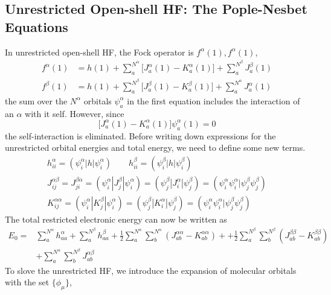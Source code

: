 \documentclass[11pt]{article}
\begin{document}
\subsection{Unrestricted Open-shell HF\@: The Pople-Nesbet Equations}
In unrestricted open-shell HF, the Fock operator is $f^\alpha(1), f^\alpha(1)$,
\begin{equation}
    \begin{split}
        f^\alpha(1)&=h(1)+\sum_{a}^{N^\alpha}\Big[J^\alpha_a(1)-K^\alpha_a(1)\Big]+\sum_{a}^{N^\beta}J^\beta_a(1)\\
        f^\beta(1)&=h(1)+\sum_{a}^{N^\beta}\Big[J^\beta_a(1)-K^\beta_a(1)\Big]+\sum_{a}^{N^\alpha}J^\alpha_a(1)
    \end{split}
\end{equation}
the sum over the $N^\alpha$ orbitals $\psi_a^\alpha$ in the first equation includes the interaction of an $\alpha$ with
it self. However, since
\begin{equation}
    \Big[J^\alpha_a(1)-K^\alpha_a(1)\Big]\psi_a^\alpha(1)=0
\end{equation}
the self-interaction is eliminated. 
Before writing down expressions for the unrestricted orbital energies and total energy, we need to define some new terms.
\begin{gather}
    h_{ii}^\alpha=(\psi_i^\alpha|h|\psi_i^\alpha)\qquad h_{ii}^\beta=(\psi_i^\beta|h|\psi_i^\beta)\\
    J_{ij}^{\alpha\beta}=J_{ji}^{\beta\alpha}=(\psi_i^\alpha|J_j^\beta|\psi_i^\alpha)=(\psi_j^\beta|J_i^\alpha|\psi_j^\beta)=(\psi_i^\alpha\psi_i^\alpha|\psi_j^\beta\psi_j^\beta)\\
    K_{ij}^{\alpha\alpha}=(\psi_i^\alpha|K_j^\beta|\psi_i^\alpha)=(\psi_j^\beta|K_i^\alpha|\psi_j^\beta)=(\psi_i^\alpha\psi_i^\alpha|\psi_j^\beta\psi_j^\beta)
\end{gather}
The total restricted electronic energy can now be written as
\begin{equation}
    \begin{split}
        E_0=&\sum_{a}^{N^\alpha}h_{aa}^\alpha+\sum_{a}^{N^\beta}h_{aa}^\beta+\frac{1}{2}\sum_{a}^{N^\alpha}\sum_{b}^{N^\alpha}(J_{ab}^{\alpha\alpha}-K_{ab}^{\alpha\alpha})++\frac{1}{2}\sum_{a}^{N^\beta}\sum_{b}^{N^\beta}(J_{ab}^{\beta\beta}-K_{ab}^{\beta\beta})\\
        &+\sum_{a}^{N^\alpha}\sum_{b}^{N^\beta}J_{ab}^{\alpha\beta}
    \end{split}
\end{equation}
To slove the unrestricted HF, we introduce the expansion of molecular orbitals with the set $\{\phi_\mu\}$,
\end{document}
